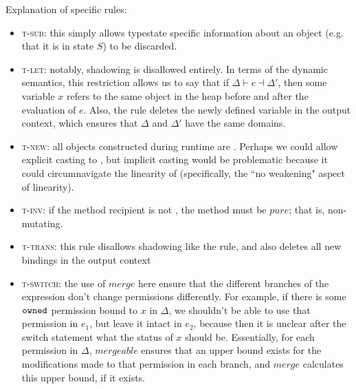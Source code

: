 \documentclass[runningheads,a4paper]{llncs}
\begin{document}
Explanation of specific rules:

\begin{itemize}
\item \textsc{t-sub}: this simply allows typestate specific information about an object (e.g. that it is in state $S$) to be discarded.

\item \textsc{t-let}: notably, shadowing is disallowed entirely. In terms of the dynamic semantics, this restriction allows us to say that if $\Delta \vdash e \dashv \Delta'$, then some variable $x$ refers to the same object in the heap before and after the evaluation of $e$. Also, the rule deletes the newly defined variable in the output context, which ensures that $\Delta$ and $\Delta'$ have the same domains.

\item \textsc{t-new}: all objects constructed during runtime are \ownedS{}. Perhaps we could allow explicit casting to \sharedS{}, but implicit casting would be problematic because it could circumnavigate the linearity of \ownedS{} (specifically, the ``no weakening" aspect of linearity).

\item \textsc{t-inv}: if the method recipient is not \ownedS{}, the method must be $pure$; that is, non-mutating.
\item \textsc{t-trans}: this rule disallows shadowing like the  rule, and also deletes all new bindings in the output context
\item \textsc{t-switch}: the use of $merge$ here ensure that the different branches of the expression don't change permissions differently. For example, if there is some $\texttt{owned}{}$ permission bound to $x$ in $\Delta$, we shouldn't be able to use that permission in $e_{1}$, but leave it intact in $e_{2}$, because then it is unclear after the switch statement what the status of $x$ should be. Essentially, for each permission in $\Delta$, $mergeable$ ensures that an upper bound exists for the modifications made to that permission in each branch, and $merge$ calculates this upper bound, if it exists.
\end{itemize}

\fi
\end{document}
